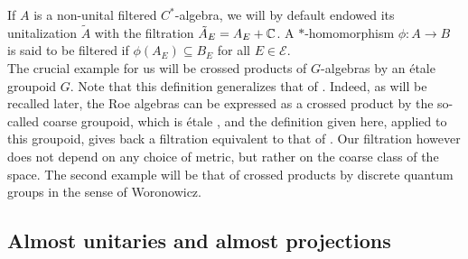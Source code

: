 If $A$ is a non-unital filtered $C^*$-algebra, we will by default endowed its unitalization $\tilde A$ with the filtration $\tilde A_E = A_E + \mathbb C$. A $*$-homomorphism $\phi : A \rightarrow B$ is said to be filtered if $\phi(A_E)\subseteq B_E$ for all $E\in\mathcal E$.\\


The crucial example for us will be crossed products of $G$-algebras by an étale groupoid $G$. Note that this definition generalizes that of \cite{OY2}. Indeed, as will be recalled later, the Roe algebras can be expressed as a crossed product by the so-called coarse groupoid, which is étale \cite{SkTuYu}, and the definition given here, applied to this groupoid, gives back a filtration equivalent to that of \cite{OY2}. Our filtration however does not depend on any choice of metric, but rather on the coarse class of the space. The second example will be that of crossed products by discrete quantum groups in the sense of Woronowicz.\cite{Wo}

\subsection{Almost unitaries and almost projections}

